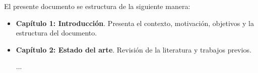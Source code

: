 El presente documento se estructura de la siguiente manera:

\begin{itemize}
    \item \textbf{Capítulo 1: Introducción}. Presenta el contexto, motivación, objetivos y la estructura del documento.
    
    \item \textbf{Capítulo 2: Estado del arte}. Revisión de la literatura y trabajos previos.

    ...
    
    
    
    
\end{itemize}
